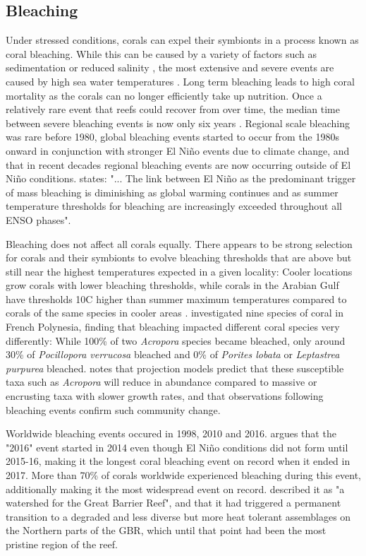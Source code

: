 \documentclass[11pt,a4paper]{article}
\begin{document}
\subsection{Bleaching}
\label{Present Bleaching}
Under stressed conditions, corals can expel their symbionts in a process known as coral bleaching. While this can be caused by a variety of factors such as sedimentation or reduced salinity \citep{Van1995}, the most extensive and severe events are caused by high sea water temperatures \citep{Baird2018}.  Long term bleaching leads to high coral mortality as the corals can no longer efficiently take up nutrition. 
Once a relatively rare event that reefs could recover from over time, the median time between severe bleaching events is now only six years \citep{Hughes2018a}. Regional scale bleaching was rare before 1980, global bleaching events started to occur from the 1980s onward in conjunction with stronger El Ni\~{n}o events due to climate change, and that in recent decades regional bleaching events are now occurring outside of El Ni\~{n}o conditions. \cite{Hughes2018a} states: "... The link between El Ni\~{n}o as the predominant trigger of mass bleaching is diminishing as global warming continues and as summer temperature thresholds for bleaching are increasingly exceeded throughout all ENSO phases".

Bleaching does not affect all corals equally. There appears to be strong selection for corals and their symbionts to evolve bleaching thresholds that are above but still near the highest temperatures expected in a given locality: Cooler locations grow corals with lower bleaching thresholds, while corals in the Arabian Gulf have thresholds 10\textdegree C higher than summer maximum temperatures compared to corals of the same species in cooler areas \citep{Hughes2003}. \cite{Hughes2003} investigated nine species of coral in French Polynesia, finding that bleaching impacted different coral species very differently: While 100\% of two \textit{Acropora} species became bleached, only around 30\% of \textit{Pocillopora verrucosa} bleached and 0\% of \textit{Porites lobata} or \textit{Leptastrea purpurea} bleached. \cite{Pandolfi2011} notes that projection models predict that these susceptible taxa such as \textit{Acropora} will reduce in abundance compared to massive or encrusting taxa with slower growth rates, and that observations following bleaching events confirm such community change. 

Worldwide bleaching events occured in 1998, 2010 and 2016.  \cite{Eakin2016} argues that the "2016" event started in 2014 even though El Ni\~{n}o conditions did not form until 2015-16, making it the longest coral bleaching event on record when it ended in 2017.  More than 70\% of corals worldwide experienced bleaching during this event, additionally making it the most widespread event on record. \cite{Hughes2018b} described it as "a watershed for the Great Barrier Reef", and that it had triggered a permanent transition to a degraded and less diverse but more heat tolerant assemblages on the Northern parts of the GBR, which until that point had been the most pristine region of the reef. 
\end{document}
